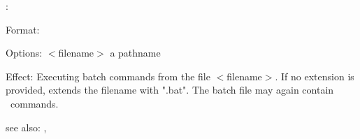\exec:

Format: 

Options: $<$filename$>$ a pathname

Effect: Executing batch commands from the file $<$filename$>$.
        If no extension is provided, \RELFUN{} extends the filename with ".bat".
	The batch file may again contain \exec\ commands.

see also: \EndScript, \script
